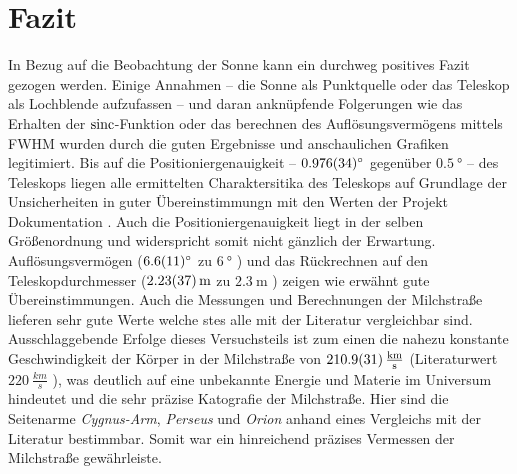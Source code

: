 \section{Fazit}
In Bezug auf die Beobachtung der Sonne kann ein durchweg positives Fazit gezogen werden.
Einige Annahmen -- die Sonne als Punktquelle oder das Teleskop als Lochblende aufzufassen -- und daran anknüpfende Folgerungen wie das Erhalten der $\operatorname{sinc}$-Funktion oder das berechnen des Auflösungsvermögens mittels FWHM wurden durch die guten Ergebnisse und anschaulichen Grafiken legitimiert.
Bis auf die Positioniergenauigkeit -- $\SI{0.976 \pm 0.034}{\degree}$ gegenüber $\SI{0.5}{\degree}$ -- des Teleskops liegen alle ermittelten Charaktersitika des Teleskops auf Grundlage der Unsicherheiten in guter Übereinstimmungn mit den Werten der Projekt Dokumentation \cite{Usermanual}.
Auch die Positioniergenauigkeit liegt in der selben Größenordnung und widerspricht somit nicht gänzlich der Erwartung.
Auflösungsvermögen ($\SI{6.6 \pm 1.1}{\degree}$ zu $\SI{6}{\degree}$ \cite{Usermanual}) und das Rückrechnen auf den Teleskopdurchmesser ($\SI{2.23 \pm 0.37}{\metre}$ zu $\SI{2.3}{\metre}$ \cite{Usermanual}) zeigen wie erwähnt gute Übereinstimmungen.\newline
Auch die Messungen und Berechnungen der Milchstraße lieferen sehr gute Werte welche stes alle mit der Literatur vergleichbar sind. Ausschlaggebende Erfolge dieses Versuchsteils ist zum einen die nahezu konstante Geschwindigkeit der Körper in der Milchstraße von $\SI{210.9 \pm 3.1}{\frac{km}{s}}$ (Literaturwert $\SI{220}{\frac{km}{s}}$ \cite{LSR}), was deutlich auf eine unbekannte Energie und Materie im Universum hindeutet und die sehr präzise Katografie der Milchstraße. Hier sind die Seitenarme \textit{Cygnus-Arm}, \textit{Perseus} und \textit{Orion} anhand eines Vergleichs mit der Literatur bestimmbar.
Somit war ein hinreichend präzises Vermessen der Milchstraße gewährleiste.

